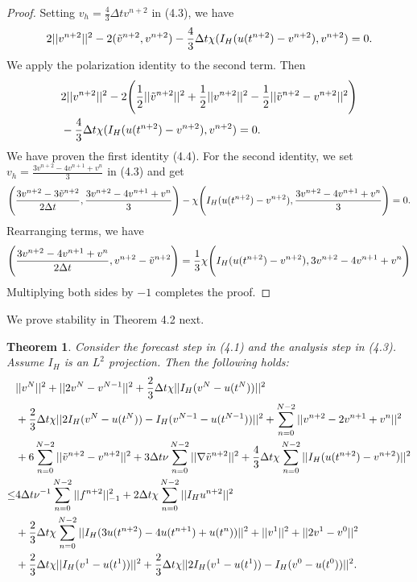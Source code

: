\documentclass[11pt,a4paper]{article}
\newtheorem{theorem}{Theorem}[section]
\begin{document}
\begin{proof}
    Setting $v_h=\frac{4}{3}\Delta tv^{n+2}$ in (4.3), we have
    \begin{align}
        2||v^{n+2}||^2-2(\Tilde{v}^{n+2}, v^{n+2})-\frac{4}{3}\Delta t\chi (I_H(u(t^{n+2})-v^{n+2}),v^{n+2})=0.
    \end{align}
    We apply the polarization identity to the second term. Then
    \begin{align}
        &2||v^{n+2}||^2-2\Bigg(\frac{1}{2}||\Tilde{v}^{n+2}||^2+\frac{1}{2}||v^{n+2}||^2-\frac{1}{2}||\Tilde{v}^{n+2}-v^{n+2}||^2\Bigg) \notag \\
        &-\frac{4}{3}\Delta t\chi (I_H(u(t^{n+2})-v^{n+2}),v^{n+2})=0.
    \end{align}
    We have proven the first identity (4.4). For the second identity, we set $v_h=\frac{3v^{n+2}-4v^{n+1}+v^n}{3}$ in (4.3) and get
    \begin{align}
        \Bigg(\frac{3v^{n+2}-3\Tilde{v}^{n+2}}{2\Delta t}, \frac{3v^{n+2}-4v^{n+1}+v^n}{3}\Bigg) -\chi \Bigg(I_H(u(t^{n+2})-v^{n+2}), \frac{3v^{n+2}-4v^{n+1}+v^n}{3}\Bigg)=0.
    \end{align}
    Rearranging terms, we have
    \begin{align}
        \Bigg(\frac{3v^{n+2}-4v^{n+1}+v^n}{2\Delta t}, v^{n+2}-\Tilde{v}^{n+2}\Bigg) =\frac{1}{3}\chi \Bigg(I_H(u(t^{n+2})-v^{n+2}), 3v^{n+2}-4v^{n+1}+v^n\Bigg)
    \end{align}
    Multiplying both sides by $-1$ completes the proof.
\end{proof}

We prove stability in Theorem 4.2 next.

\begin{theorem}
    Consider the forecast step in (4.1) and the analysis step in (4.3). Assume $I_H$ is an $L^2$ projection. Then the following holds:
    \begin{align}
        &||v^N||^2+||2v^N-v^{N-1}||^2+\frac{2}{3}\Delta t\chi ||I_H(v^N-u(t^N))||^2 \notag \\
        &+\frac{2}{3}\Delta t\chi ||2I_H(v^N-u(t^N))-I_H(v^{N-1}-u(t^{N-1}))||^2 + \sum_{n=0}^{N-2}||v^{n+2}-2v^{n+1}+v^n||^2 \notag \\
        &+6\sum_{n=0}^{N-2}||\Tilde{v}^{n+2}-v^{n+2}||^2 + 3\Delta t\nu \sum_{n=0}^{N-2}||\nabla \Tilde{v}^{n+2}||^2 +\frac{4}{3}\Delta t\chi \sum_{n=0}^{N-2}||I_H(u(t^{n+2})-v^{n+2})||^2  \notag \\
        \leq& 4\Delta t\nu^{-1}\sum_{n=0}^{N-2}||f^{n+2}||_{-1}^2+2\Delta t\chi \sum_{n=0}^{N-2} ||I_Hu^{n+2}||^2 \\
        &+ \frac{2}{3}\Delta t\chi \sum_{n=0}^{N-2}||I_H(3u(t^{n+2})-4u(t^{n+1})+u(t^n))||^2 +||v^1||^2+||2v^1-v^0||^2 \notag \\
        &+\frac{2}{3}\Delta t\chi ||I_H(v^1-u(t^1))||^2+\frac{2}{3}\Delta t\chi ||2I_H(v^1-u(t^1))-I_H(v^0-u(t^0))||^2. \notag
    \end{align}
\end{theorem}
\end{document}

